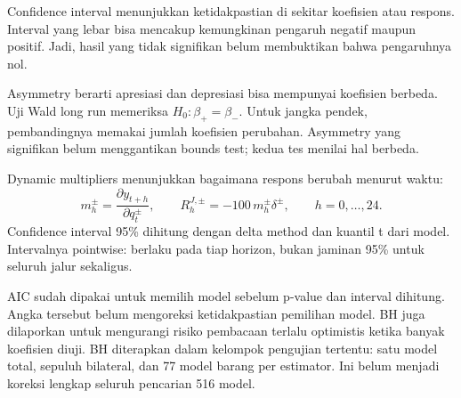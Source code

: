 Confidence interval menunjukkan ketidakpastian di sekitar koefisien atau respons. Interval yang lebar bisa mencakup kemungkinan pengaruh negatif maupun positif. Jadi, hasil yang tidak signifikan belum membuktikan bahwa pengaruhnya nol.

Asymmetry berarti apresiasi dan depresiasi bisa mempunyai koefisien berbeda. Uji Wald long run memeriksa $H_0:\beta_+=\beta_-$. Untuk jangka pendek, pembandingnya memakai jumlah koefisien perubahan. Asymmetry yang signifikan belum menggantikan bounds test; kedua tes menilai hal berbeda.

Dynamic multipliers menunjukkan bagaimana respons berubah menurut waktu:
\begin{equation}
 m_h^\pm=\frac{\partial y_{t+h}}{\partial q_t^\pm},\qquad
 R_h^{J,\pm}=-100\,m_h^\pm\delta^\pm,\qquad h=0,\ldots,24.
\end{equation}
Confidence interval 95\% dihitung dengan delta method dan kuantil t dari model. Intervalnya pointwise: berlaku pada tiap horizon, bukan jaminan 95\% untuk seluruh jalur sekaligus.

AIC sudah dipakai untuk memilih model sebelum p-value dan interval dihitung. Angka tersebut belum mengoreksi ketidakpastian pemilihan model. BH \cite{bh} juga dilaporkan untuk mengurangi risiko pembacaan terlalu optimistis ketika banyak koefisien diuji. BH diterapkan dalam kelompok pengujian tertentu: satu model total, sepuluh bilateral, dan 77 model barang per estimator. Ini belum menjadi koreksi lengkap seluruh pencarian 516 model.

